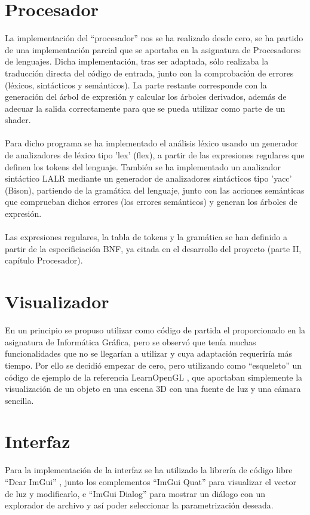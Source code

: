 \section*{Procesador}
La implementación del ``procesador'' nos se ha realizado desde cero, se ha partido de una implementación parcial que se aportaba en la asignatura de Procesadores de lenguajes. Dicha implementación, tras ser adaptada, sólo realizaba la traducción directa del código de entrada, junto con la comprobación de errores (léxicos, sintácticos y semánticos). La parte restante corresponde con la generación del árbol de expresión y calcular los árboles derivados, además de adecuar la salida correctamente para que se pueda utilizar como parte de un shader.\\
\\Para dicho programa se ha implementado el análisis léxico usando un generador de analizadores de léxico tipo 'lex' (flex), a partir de las expresiones regulares que definen los tokens del lenguaje. También se ha implementado un analizador sintáctico LALR mediante un generador de analizadores sintácticos tipo 'yacc' (Bison), partiendo de la gramática del lenguaje, junto con las acciones semánticas que comprueban dichos errores (los errores semánticos) y generan los árboles de expresión.\\
\\Las expresiones regulares, la tabla de tokens y la gramática se han definido a partir de la especificiación BNF, ya citada en el desarrollo del proyecto (parte II, capítulo Procesador).

\section*{Visualizador}
En un principio se propuso utilizar como código de partida el proporcionado en la asignatura de Informática Gráfica, pero se observó que tenía muchas funcionalidades que no se llegarían a utilizar y cuya adaptación requeriría más tiempo. Por ello se decidió empezar de cero, pero utilizando como ``esqueleto'' un código de ejemplo de la referencia LearnOpenGL \cite{LearnOGL}, que aportaban simplemente la visualización de un objeto en una escena $3$D con una fuente de luz y una cámara sencilla.

\section*{Interfaz}
Para la implementación de la interfaz se ha utilizado la librería de código libre ``Dear ImGui'' \cite{DearImGui}, junto los complementos ``ImGui Quat'' \cite{LVector} para visualizar el vector de luz y modificarlo, e ``ImGui Dialog'' \cite{Dialog} para mostrar un diálogo con un explorador de archivo y así poder seleccionar la parametrización deseada.

